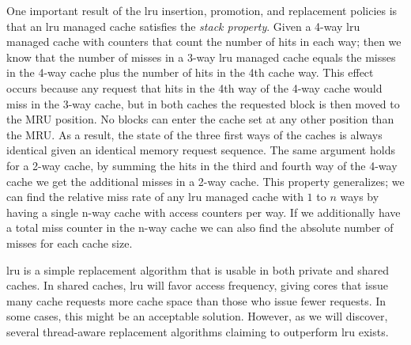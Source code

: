 One important result of the \gls{lru} insertion, promotion, and replacement policies is that an \gls{lru} managed cache satisfies the \textit{stack property}.
Given a 4-way \gls{lru} managed cache with counters that count the number of hits in each way; then we know that the number of misses in a 3-way \gls{lru} managed cache equals the misses in the 4-way cache plus the number of hits in the 4th cache way.
This effect occurs because any request that hits in the 4th way of the 4-way cache would miss in the 3-way cache, but in both caches the requested block is then moved to the MRU position.
No blocks can enter the cache set at any other position than the MRU.
As a result, the state of the three first ways of the caches is always identical given an identical memory request sequence.
The same argument holds for a 2-way cache, by summing the hits in the third and fourth way of the 4-way cache we get the additional misses in a 2-way cache.
This property generalizes; we can find the relative miss rate of any \gls{lru} managed cache with $1$ to $n$ ways by having a single n-way cache with access counters per way.
If we additionally have a total miss counter in the n-way cache we can also find the absolute number of misses for each cache size.

\gls{lru} is a simple replacement algorithm that is usable in both private and shared caches.
In shared caches, \gls{lru} will favor access frequency, giving cores that issue many cache requests more cache space than those who issue fewer requests. 
In some cases, this might be an acceptable solution. 
However, as we will discover, several thread-aware replacement algorithms claiming to outperform \gls{lru} exists. 

